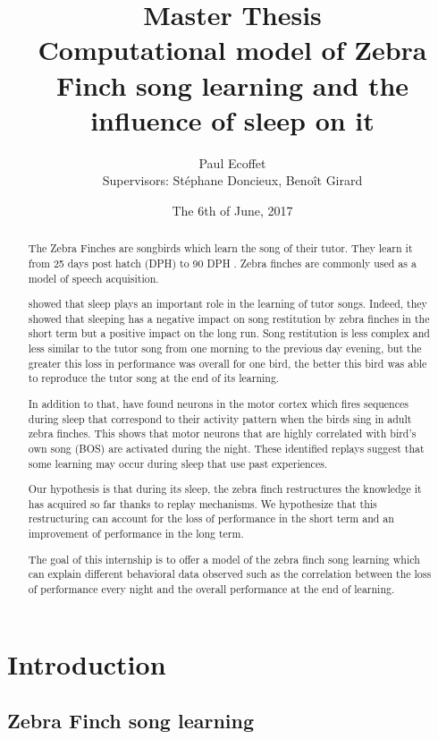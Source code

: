 \documentclass{report}
\title{Master Thesis\\ Computational model of Zebra Finch song learning and the
influence of sleep on it}
\author{Paul Ecoffet\\
Supervisors: Stéphane Doncieux, Benoît Girard}
\date{The 6th of June, 2017}
\begin{document}
\maketitle

\begin{abstract}
The Zebra Finches are songbirds which learn the song of their tutor. They learn
it from 25 days post hatch (DPH) to 90 DPH \parencite{liu_juvenile_2004}. Zebra
finches are commonly used as a model of speech acquisition.

\textcite{deregnaucourt_how_2005} showed that sleep plays an important role in
the learning of tutor songs. Indeed, they showed that sleeping has a negative
impact on song restitution by zebra finches in the short term but a positive
impact on the long run. Song restitution is less complex and less similar to the
tutor song from one morning to the previous day evening, but the greater this
loss in performance was overall for one bird, the better this bird was able to
reproduce the tutor song at the end of its learning.

In addition to that, \textcite{dave_song_2000} have found neurons in the motor
cortex which fires sequences during sleep that correspond to their activity
pattern when the birds sing in adult zebra finches. This shows that motor
neurons that are highly correlated with bird's own song (BOS) are activated
during the night. These identified replays suggest that some learning may occur
during sleep that use past experiences.

Our hypothesis is that during its sleep, the zebra finch restructures the
knowledge it has acquired so far thanks to replay mechanisms. We hypothesize
that this restructuring can account for the loss of performance in the short
term and an improvement of performance in the long term.

The goal of this internship is to offer a model of the zebra finch song
learning which can explain different behavioral data observed such as the
correlation between the loss of performance every night and the overall
performance at the end of learning.
\end{abstract}

\tableofcontents

\chapter{Introduction}\label{introduction}

\section{Zebra Finch song learning}\label{zebra-finch-song-learning}
\end{document}
